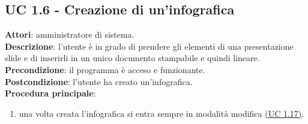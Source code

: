 \subsection{UC 1.6 - Creazione di un'infografica}{
	\label{uc1.6}
	\textbf{Attori}: amministratore di sistema. \\
	\textbf{Descrizione}: l'utente è in grado di prendere gli elementi di una presentazione slide e di inserirli in un unico documento stampabile e quindi lineare. \\
	\textbf{Precondizione}: il programma è acceso e funzionante.	\\
	\textbf{Postcondizione}: l'utente ha creato un'infografica.	\\
	\textbf{Procedura principale}:
	\begin{enumerate}
		\item una volta creata l'infografica si entra sempre in modalità modifica \hyperref[uc1.17]{(UC 1.17)}.
	\end{enumerate}
	}

